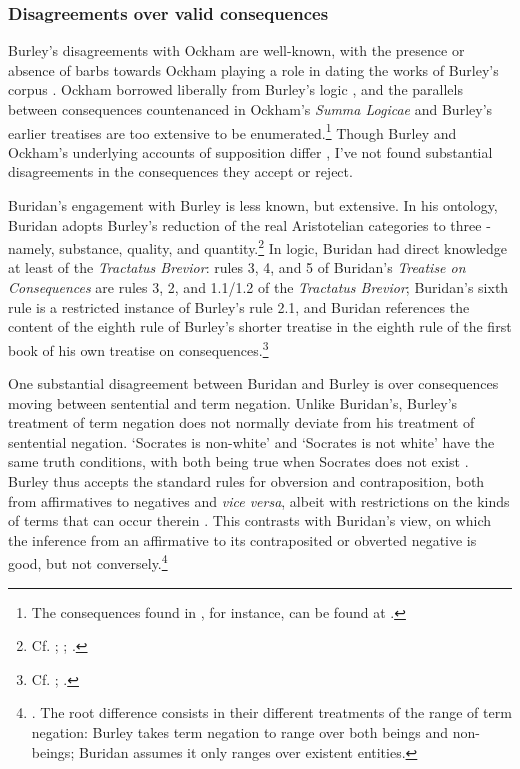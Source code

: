 \documentclass[]{birkjour}
\begin{document}
\subsubsection{Disagreements over valid consequences}
Burley's disagreements with Ockham are well-known, with the presence or absence of barbs towards Ockham playing a role in dating the works of Burley's corpus \autocite{Ottman1999,Vittorini2013}. Ockham borrowed liberally from Burley's logic \autocite{Brown1972}, and the parallels between consequences countenanced in Ockham's \textit{Summa Logicae} and Burley's earlier treatises are too extensive to be enumerated.\footnote{The consequences found in \autocite[III-3.38, pp. 727-731]{OckhamSL}, for instance, can be found at \autocite[par. 1, 4, 9, 14-15, 71-72, and 86-88]{Green-Pedersen1980b}.} Though Burley and Ockham's underlying accounts of supposition differ \autocite{Wagner1981}, I've not found substantial disagreements in the consequences they accept or reject.

Buridan's engagement with Burley is less known, but extensive. In his ontology, Buridan adopts Burley's reduction of the real Aristotelian categories to three - namely, substance, quality, and quantity.\footnote{Cf. \autocite[pp. 204]{Klima2009}; \autocite[p. 155]{Read2016b}; \autocite{DutilhNovaes2013}.} In logic, Buridan had direct knowledge at least of the \textit{Tractatus Brevior}: rules 3, 4, and 5 of Buridan's \textit{Treatise on Consequences} are rules 3, 2, and 1.1/1.2 of the \textit{Tractatus Brevior}; Buridan's sixth rule is a restricted instance of Burley's rule 2.1, and Buridan references the content of the eighth rule of Burley's shorter treatise in the eighth rule of the first book of his own treatise on consequences.\footnote{Cf. \autocite[p. 212.29-31]{BurleyDPAL}; \autocite[I. 8]{BuridanTC}.}

One substantial disagreement between Buridan and Burley is over consequences moving between sentential and term negation. Unlike Buridan's, Burley's treatment of term negation does not normally deviate from his treatment of sentential negation. `Socrates is non-white' and `Socrates is not white' have the same truth conditions, with both being true when Socrates does not exist \autocite[pp. 57.17-58.12; 215.6-21; 216.15-18]{BurleyDPAL}. Burley thus accepts the standard rules for obversion and contraposition, both from affirmatives to negatives and \textit{vice versa}, albeit with restrictions on the kinds of terms that can occur therein \autocite[pp. 129-131, par. 73-81]{Green-Pedersen1980b}. This contrasts with Buridan's view, on which the inference from an affirmative to its contraposited or obverted negative is good, but not conversely.\footnote{\autocite[p. 85]{Buridan2015}. The root difference consists in their different treatments of the range of term negation: Burley takes term negation to range over both beings and non-beings; Buridan assumes it only ranges over existent entities.}
\end{document}
